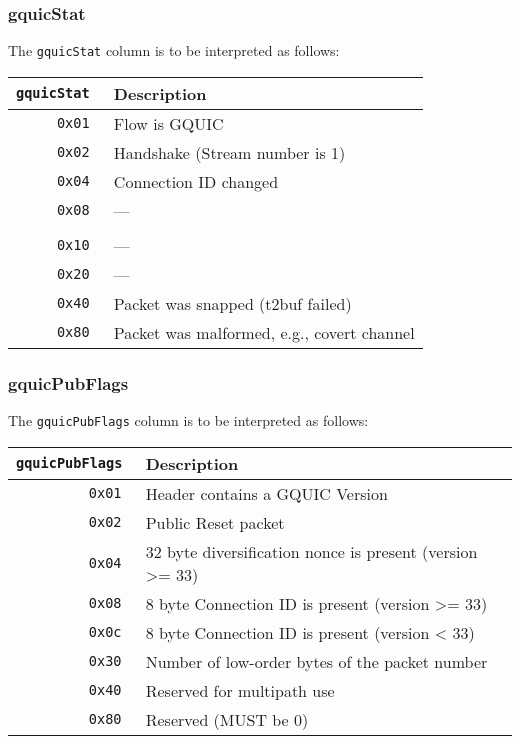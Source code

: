 \documentclass[documentation]{subfiles}
\begin{document}
\subsubsection{gquicStat}\label{gquicStat}
The {\tt gquicStat} column is to be interpreted as follows:
\begin{longtable}{>{\tt}rl}
    \toprule
    {\bf gquicStat} & {\bf Description}\\
    \midrule\endhead%
    0x01 & Flow is GQUIC\\
    0x02 & Handshake (Stream number is 1)\\
    0x04 & Connection ID changed\\
    0x08 & ---\\
    \\
    0x10 & ---\\
    0x20 & ---\\
    0x40 & Packet was snapped (t2buf failed)\\
    0x80 & Packet was malformed, e.g., covert channel\\
    \bottomrule
\end{longtable}

\subsubsection{gquicPubFlags}\label{gquicPubFlags}
The {\tt gquicPubFlags} column is to be interpreted as follows:
\begin{longtable}{>{\tt}rl}
    \toprule
    {\bf gquicPubFlags} & {\bf Description}\\
    \midrule\endhead%
    0x01 & Header contains a GQUIC Version\\
    0x02 & Public Reset packet\\
    0x04 & 32 byte diversification nonce is present (version >= 33)\\
    0x08 & 8 byte Connection ID is present (version >= 33)\\
    0x0c & 8 byte Connection ID is present (version < 33)\\
    0x30 & Number of low-order bytes of the packet number\\
    0x40 & Reserved for multipath use\\
    0x80 & Reserved (MUST be 0)\\
    \bottomrule
\end{longtable}

\end{document}
